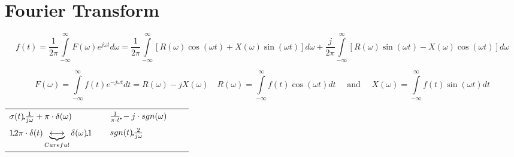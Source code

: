 \section{Fourier Transform}
	$$\boxed{f(t) =  \frac{1}{2\pi}\int\limits_{-\infty}^{\infty}
	F(\omega)e^{j\omega t}d\omega}=\frac{1}{2
	\pi}\int\limits_{-\infty}^{\infty}[R(\omega) \cos(\omega t) + X(\omega)
	\sin(\omega t)]d\omega + \frac{j}{2 \pi}\int \limits_{-
	\infty}^{\infty}[R(\omega) \sin(\omega t)- X(\omega) \cos(\omega t)]d\omega$$

	$$\boxed{F(\omega) = \int\limits_{-\infty}^{\infty} f(t)e^{-j\omega t}dt}
	= R(\omega) - j X(\omega) \quad R(\omega) = \int\limits_{-\infty}^{\infty}
	f(t)\cos(\omega t)dt \quad \mbox{ and } \quad X(\omega)=
	\int\limits_{-\infty}^{\infty}f(t)\sin(\omega t)dt$$
	\begin{tabular}{lllll}
	 $ \sigma(t) \FT \frac{1}{j\omega}+\pi \cdot \delta(\omega) $ & \hspace{6mm} &
	 $ \frac{1}{\pi \cdot t} \FT -j \cdot sgn(\omega) $ & \hspace{6mm} &  \\
	 $ 1 \FT 2\pi \cdot \delta(t) \underbrace{\longleftrightarrow}_{Careful}
	 \delta(\omega) \FT 1 $ & & $ sgn(t) \FT \frac{2}{j\omega} $
	\end{tabular}

